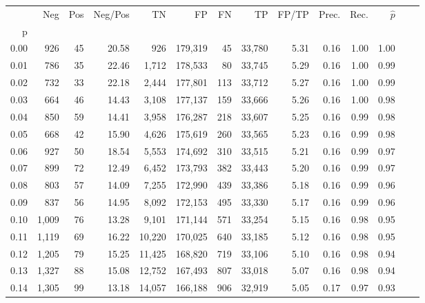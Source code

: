 \begin{tabular}{rrrrrrrrrrrrrr}
\toprule
{} &    Neg &  Pos & Neg/Pos &       TN &       FP &      FN &      TP & FP/TP & Prec. &  Rec. & $\hat{p}$ \\
p    &        &      &         &          &          &         &         &       &       &       &           \\
\midrule
0.00 &    926 &   45 &   20.58 &      926 &  179,319 &      45 &  33,780 &  5.31 &  0.16 &  1.00 &      1.00 \\
0.01 &    786 &   35 &   22.46 &    1,712 &  178,533 &      80 &  33,745 &  5.29 &  0.16 &  1.00 &      0.99 \\
0.02 &    732 &   33 &   22.18 &    2,444 &  177,801 &     113 &  33,712 &  5.27 &  0.16 &  1.00 &      0.99 \\
0.03 &    664 &   46 &   14.43 &    3,108 &  177,137 &     159 &  33,666 &  5.26 &  0.16 &  1.00 &      0.98 \\
0.04 &    850 &   59 &   14.41 &    3,958 &  176,287 &     218 &  33,607 &  5.25 &  0.16 &  0.99 &      0.98 \\
0.05 &    668 &   42 &   15.90 &    4,626 &  175,619 &     260 &  33,565 &  5.23 &  0.16 &  0.99 &      0.98 \\
0.06 &    927 &   50 &   18.54 &    5,553 &  174,692 &     310 &  33,515 &  5.21 &  0.16 &  0.99 &      0.97 \\
0.07 &    899 &   72 &   12.49 &    6,452 &  173,793 &     382 &  33,443 &  5.20 &  0.16 &  0.99 &      0.97 \\
0.08 &    803 &   57 &   14.09 &    7,255 &  172,990 &     439 &  33,386 &  5.18 &  0.16 &  0.99 &      0.96 \\
0.09 &    837 &   56 &   14.95 &    8,092 &  172,153 &     495 &  33,330 &  5.17 &  0.16 &  0.99 &      0.96 \\
0.10 &  1,009 &   76 &   13.28 &    9,101 &  171,144 &     571 &  33,254 &  5.15 &  0.16 &  0.98 &      0.95 \\
0.11 &  1,119 &   69 &   16.22 &   10,220 &  170,025 &     640 &  33,185 &  5.12 &  0.16 &  0.98 &      0.95 \\
0.12 &  1,205 &   79 &   15.25 &   11,425 &  168,820 &     719 &  33,106 &  5.10 &  0.16 &  0.98 &      0.94 \\
0.13 &  1,327 &   88 &   15.08 &   12,752 &  167,493 &     807 &  33,018 &  5.07 &  0.16 &  0.98 &      0.94 \\
0.14 &  1,305 &   99 &   13.18 &   14,057 &  166,188 &     906 &  32,919 &  5.05 &  0.17 &  0.97 &      0.93 \\

\end{tabular}
